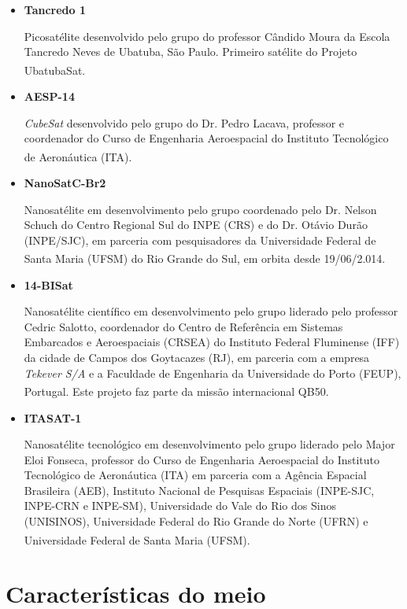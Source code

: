 \documentclass[
	12pt,				%
	openright,			%
	oneside,			%
	a4paper,			%
	english,			%
	french,				%
	spanish,			%
	brazil,				%
	oldfontcommands
	]{abntex2}
\begin{document}
	\begin{itemize}
		\item \textbf{Tancredo 1}
		
			Picosatélite desenvolvido pelo grupo do professor Cândido Moura da Escola Tancredo Neves de Ubatuba, São Paulo. Primeiro satélite do Projeto UbatubaSat.\textsuperscript{\cite{UbatubaSat}}
			
		\item \textbf{AESP-14}		
		
			\textit{CubeSat} desenvolvido pelo grupo do Dr. Pedro Lacava, professor e coordenador do Curso de Engenharia Aeroespacial do Instituto Tecnológico de Aeronáutica (ITA).\textsuperscript{\cite{AESP14}}
			
		\item \textbf{NanoSatC-Br2}
		
			Nanosatélite em desenvolvimento pelo grupo coordenado pelo Dr. Nelson Schuch do Centro Regional Sul do INPE (CRS) e do Dr. Otávio Durão (INPE/SJC), em parceria com pesquisadores da Universidade Federal de Santa Maria (UFSM) do Rio Grande do Sul, em orbita desde 19/06/2.014.\textsuperscript{\cite{INPE}}

		\item \textbf{14-BISat}

			Nanosatélite científico em desenvolvimento pelo grupo liderado pelo professor Cedric Salotto, coordenador do Centro de Referência em Sistemas Embarcados e Aeroespaciais (CRSEA) do Instituto Federal Fluminense (IFF) da cidade de Campos dos Goytacazes (RJ), em parceria com a empresa \textit{Tekever S/A} e a Faculdade de Engenharia da Universidade do Porto (FEUP), Portugal. Este projeto faz parte da missão internacional QB50.\textsuperscript{\cite{IFF}}
			
		\item \textbf{ITASAT-1}	

			Nanosatélite tecnológico em desenvolvimento pelo grupo liderado pelo Major Eloi Fonseca, professor do Curso de Engenharia Aeroespacial do Instituto Tecnológico de Aeronáutica (ITA) em parceria com a Agência Espacial Brasileira (AEB), Instituto Nacional de Pesquisas Espaciais (INPE-SJC, INPE-CRN e INPE-SM), Universidade do Vale do Rio dos Sinos (UNISINOS), Universidade Federal do Rio Grande do Norte (UFRN) e Universidade Federal de Santa Maria (UFSM).\textsuperscript{\cite{ITASAT}}	
			
	\end{itemize}

\section[Características do meio]{Características do meio}
	
\end{document}
